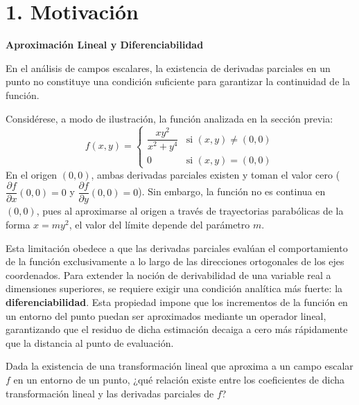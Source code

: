 \documentclass[11pt]{article}
\newenvironment{motivacion}{%
  \section*{1. Motivación}%
}{}
\newenvironment{preguntaguia}{%
  \begin{tcolorbox}[colback=cyan!5,colframe=cyan!75!black,title=Pregunta Guía]%
}{%
  \end{tcolorbox}%
}
\begin{document}
\begin{motivacion}
  \textbf{Aproximación Lineal y Diferenciabilidad}

  En el análisis de campos escalares, la existencia de derivadas parciales en un punto no constituye una condición suficiente para garantizar la continuidad de la función.

  Considérese, a modo de ilustración, la función analizada en la sección previa:
  $$ f(x,y) = \begin{cases} \dfrac{xy^2}{x^2 + y^4} & \text{si } (x,y) \neq (0,0) \\[1em] 0 & \text{si } (x,y) = (0,0) \end{cases} $$
  En el origen $(0,0)$, ambas derivadas parciales existen y toman el valor cero ($\dfrac{\partial f}{\partial x}(0,0) = 0$ y $\dfrac{\partial f}{\partial y}(0,0) = 0$). Sin embargo, la función no es continua en $(0,0)$, pues al aproximarse al origen a través de trayectorias parabólicas de la forma $x = my^2$, el valor del límite depende del parámetro $m$.

  Esta limitación obedece a que las derivadas parciales evalúan el comportamiento de la función exclusivamente a lo largo de las direcciones ortogonales de los ejes coordenados. Para extender la noción de derivabilidad de una variable real a dimensiones superiores, se requiere exigir una condición analítica más fuerte: la \textbf{diferenciabilidad}. Esta propiedad impone que los incrementos de la función en un entorno del punto puedan ser aproximados mediante un operador lineal, garantizando que el residuo de dicha estimación decaiga a cero más rápidamente que la distancia al punto de evaluación.

  \begin{preguntaguia}
    Dada la existencia de una transformación lineal que aproxima a un campo escalar $f$ en un entorno de un punto, ¿qué relación existe entre los coeficientes de dicha transformación lineal y las derivadas parciales de $f$?
  \end{preguntaguia}
\end{motivacion}
\end{document}
